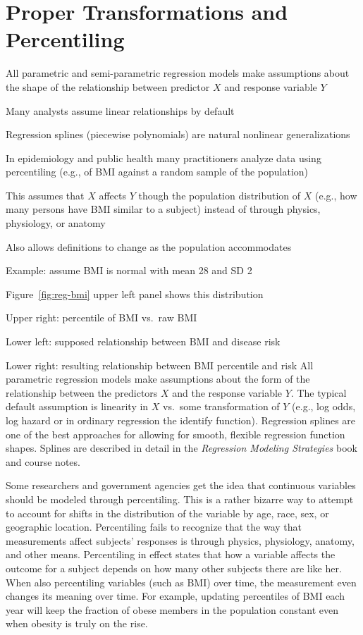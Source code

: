 \section{Proper Transformations and Percentiling}
\bi
\item All parametric and semi-parametric regression models make
  assumptions about the shape of the relationship between predictor
  $X$ and response variable $Y$
\item Many analysts assume linear relationships by default
\item Regression splines (piecewise polynomials) are natural nonlinear
  generalizations
\item In epidemiology and public health many practitioners analyze
  data using percentiling (e.g., of BMI against a random sample of the
  population)
\item This assumes that $X$ affects $Y$ though the population
  distribution of $X$ (e.g., how many persons have BMI similar to a
  subject) instead of through physics, physiology, or anatomy
\item Also allows definitions to change as the population accommodates
\item Example: assume BMI is normal with mean 28 and SD 2\ipacue
\item Figure~\ref{fig:reg-bmi} upper left panel shows this distribution
\item Upper right: percentile of BMI vs.\ raw BMI
\item Lower left: supposed relationship between BMI and disease risk
\item Lower right: resulting relationship between BMI percentile and risk
\ei
All parametric regression models make assumptions about the form of
the relationship between the predictors $X$ and the response variable
$Y$.  The typical default assumption is linearity in $X$ vs.\ some
transformation of $Y$ (e.g., log odds, log hazard or in ordinary
regression the identify function).  Regression splines are one of the
best approaches for allowing for smooth, flexible regression function
shapes.  Splines are described in detail in the \emph{Regression
  Modeling Strategies} book and course notes.

Some researchers and government agencies get the idea that continuous
variables should be modeled through percentiling.  This is a rather
bizarre way to attempt to account for shifts in the distribution of
the variable by age, race, sex, or geographic location.  Percentiling
fails to recognize that the way that measurements affect subjects'
responses is through physics, physiology, anatomy, and other means.
Percentiling in effect states that how a variable affects the outcome
for a subject depends on how many other subjects there are like her.
When also percentiling variables (such as BMI) over time, the
measurement even changes its meaning over time.  For example, updating
percentiles of BMI each year will keep the fraction of obese members
in the population constant even when obesity is truly on the rise.

